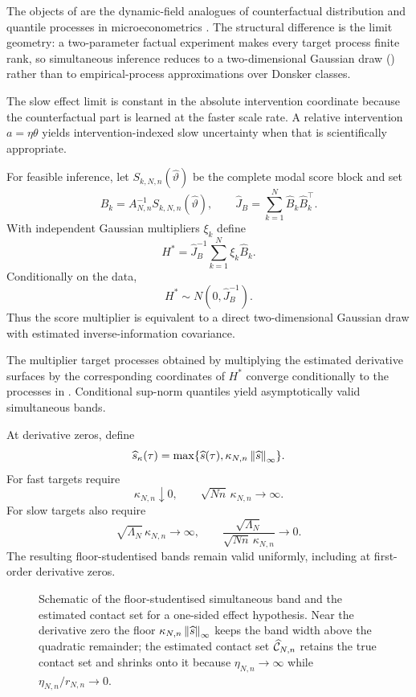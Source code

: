 \begin{remark}\label{rem:cfm}
The objects of  are the dynamic-field analogues of counterfactual distribution and quantile processes in microeconometrics \citep{ChernozhukovFernandezValMelly2013}. The structural difference is the limit geometry: a two-parameter factual experiment makes every target process finite rank, so simultaneous inference reduces to a two-dimensional Gaussian draw () rather than to empirical-process approximations over Donsker classes.
\end{remark}

The slow effect limit is constant in the absolute intervention coordinate because the counterfactual part is learned at the faster scale rate. A relative intervention $a=\eta\theta$ yields intervention-indexed slow uncertainty when that is scientifically appropriate.

For feasible inference, let $S_{k,N,n}(\widehat\vartheta)$ be the complete modal score block and set
\[
 \widehat B_k=A_{N,n}^{-1}S_{k,N,n}(\widehat\vartheta),
 \qquad
 \widehat J_B=\sum_{k=1}^N\widehat B_k\widehat B_k^\top.
\]
With independent Gaussian multipliers $\xi_k$ define
\[
 H^*=\widehat J_B^{-1}\sum_{k=1}^N\xi_k\widehat B_k.
\]
Conditionally on the data,
\[
 H^*\sim N(0,\widehat J_B^{-1}).
\]
Thus the score multiplier is equivalent to a direct two-dimensional Gaussian draw with estimated inverse-information covariance.

\begin{theorem}\label{thm:bands}
The multiplier target processes obtained by multiplying the estimated derivative surfaces by the corresponding coordinates of $H^*$ converge conditionally to the processes in . Conditional sup-norm quantiles yield asymptotically valid simultaneous bands.

At derivative zeros, define
\[
 \widehat s_\kappa(\tau)
 =\max\{\widehat s(\tau),\kappa_{N,n}\left\lVert\widehat s\right\rVert_\infty\}.
\]
For fast targets require
\[
 \kappa_{N,n}\downarrow0,
 \qquad
 \sqrt{Nn}\,\kappa_{N,n}\to\infty.
\]
For slow targets also require
\[
 \sqrt{\Lambda_N}\,\kappa_{N,n}\to\infty,
 \qquad
 \frac{\sqrt{\Lambda_N}}{\sqrt{Nn}\,\kappa_{N,n}}\to0.
\]
The resulting floor-studentised bands remain valid uniformly, including at first-order derivative zeros.
\end{theorem}

\begin{figure}[t]
\centering
\resizebox{.8\textwidth}{!}{}
\caption{Schematic of the floor-studentised simultaneous band and the estimated contact set for a one-sided effect hypothesis. Near the derivative zero the floor $\kappa_{N,n}\left\lVert\widehat s\right\rVert_\infty$ keeps the band width above the quadratic remainder; the estimated contact set $\widehat{\mathcal C}_{N,n}$ retains the true contact set and shrinks onto it because $\eta_{N,n}\to\infty$ while $\eta_{N,n}/r_{N,n}\to0$.}
\label{fig:band-contact}
\end{figure}

